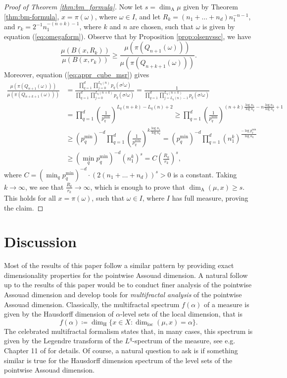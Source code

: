 \documentclass{PRM}
\newcommand{\adim}{\dim_{\mathrm{A}}}
\theoremstyle{plain}
\theoremstyle{definition}
\theoremstyle{remark}
\begin{document}
\begin{proof}[Proof of Theorem \ref{thm:bm_formula}]
Now let $s=\adim\mu$ given by Theorem \ref{thm:bm-formula}, $x=\pi(\omega)$, where $\omega\in I$, and let $R_k=(n_1+\ldots+n_d)n_1^{-n-1}$, and $r_k=2^{-1}n_1^{-(n+k)-1}$, where $k$ and $n$ are chosen, such that $\omega$ is given by equation (\ref{eq:omegaform}). Observe that by Proposition \ref{prop:olsenvssc}, we have
\begin{equation*}
    \frac{\mu(B(x,R_k))}{\mu(B(x,r_k))}\geq \frac{\mu(\pi(Q_{n+1}(\omega)))}{\mu(\pi(Q_{n+k+1}(\omega)))}.
\end{equation*}
Moreover, equation (\ref{eq:appr_cube_msr}) gives
\begin{align*}
    \frac{\mu(\pi(Q_{n+1}(\omega)))}{\mu(\pi(Q_{n+k+1}(\omega)))}&=\frac{\prod_{q=1}^d\prod_{j=0}^{L_q(n)}p_q(\sigma^j\omega)}{\prod_{q=1}^d\prod_{j=0}^{L_q(n+k)}p_q(\sigma^j\omega)}=\frac{1}{\prod_{q=1}^d\prod_{j=L_q(n)-1}^{L_q(n+k)}p_q(\sigma^j\omega)}\\
    &=\prod_{q=1}^d\left(\frac{1}{p_q^{\min}}\right)^{L_q(n+k)-L_q(n)+2}\geq \prod_{q=1}^d\left(\frac{1}{p_q^{\min}}\right)^{(n+k)\frac{\log n_1}{\log n_q}-n\frac{\log n_1}{\log n_q}+1}\\
    &\geq (p_q^{\min})^{-d}\prod_{q=1}^d\left(\frac{1}{p_q^{\min}}\right)^{k\frac{\log n_1}{\log n_q}}=(p_q^{\min})^{-d}\prod_{q=1}^d\left(n_1^k\right)^{\frac{-\log p_q^{\min}}{\log n_q}}\\
    &\geq (\min_{q}p_q^{\min})^{-d}\left(n_1^k\right)^{s}=C\left(\frac{R_k}{r_k}\right)^{s},
\end{align*}
where $C=(\min_{q}p_q^{\min})^{-d}\cdot(2(n_1+\ldots+n_d))^s>0$ is a constant. Taking $k\to\infty$, we see that $\frac{R_k}{r_k}\to \infty$, which is enough to prove that $\dim_{\mathrm{A}}(\mu,x)\geq s$. This holds for all $x=\pi(\omega)$, such that $\omega\in I$, where $I$ has full measure, proving the claim.
\end{proof}

\section{Discussion}
Most of the results of this paper follow a similar pattern by providing exact dimensionality properties for the pointwise Assouad dimension. A natural follow up to the results of this paper would be to conduct finer analysis of the pointwise Assouad dimension and develop tools for \emph{multifractal analysis} of the pointwise Assouad dimension. Classically, the multifractal spectrum $f(\alpha)$ of a measure is given by the Hausdorff dimension of $\alpha$-level sets of the local dimension, that is 
\begin{equation*}
    f(\alpha)\coloneqq \dim_{\mathrm{H}}\{x\in X\colon \dim_{\mathrm{loc}}(\mu,x)=\alpha\}.
\end{equation*}
The celebrated multifractal formalism states that, in many cases, this spectrum is given by the Legendre transform of the $L^q$-spectrum of the measure, see e.g. Chapter 11 of \cite{Falc1} for details. Of course, a natural question to ask is if something similar is true for the Hausdorff dimension spectrum of the level sets of the pointwise Assouad dimension.
\end{document}

